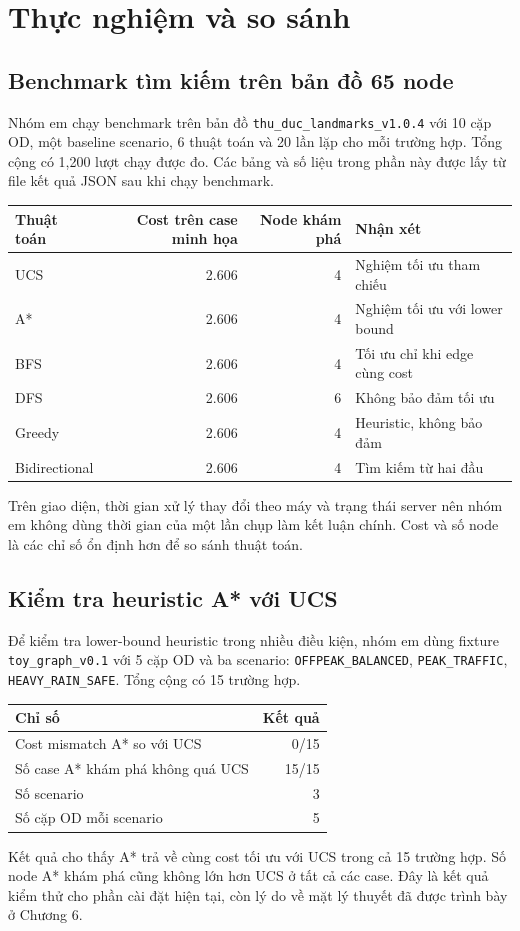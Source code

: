 \section{Thực nghiệm và so sánh}
\subsection{Benchmark tìm kiếm trên bản đồ 65 node}
Nhóm em chạy benchmark trên bản đồ \texttt{thu\_duc\_landmarks\_v1.0.4} với 10 cặp OD, một baseline scenario, 6 thuật toán và 20 lần lặp cho mỗi trường hợp. Tổng cộng có 1,200 lượt chạy được đo. Các bảng và số liệu trong phần này được lấy từ file kết quả JSON sau khi chạy benchmark.

\begin{center}
{\small
\begin{tabular}{l r r l}
\toprule
Thuật toán & Cost trên case minh họa & Node khám phá & Nhận xét\\
\midrule
UCS & 2.606 & 4 & Nghiệm tối ưu tham chiếu\\
A* & 2.606 & 4 & Nghiệm tối ưu với lower bound\\
BFS & 2.606 & 4 & Tối ưu chỉ khi edge cùng cost\\
DFS & 2.606 & 6 & Không bảo đảm tối ưu\\
Greedy & 2.606 & 4 & Heuristic, không bảo đảm\\
Bidirectional & 2.606 & 4 & Tìm kiếm từ hai đầu\\
\bottomrule
\end{tabular}
}
\end{center}
Trên giao diện, thời gian xử lý thay đổi theo máy và trạng thái server nên nhóm em không dùng thời gian của một lần chụp làm kết luận chính. Cost và số node là các chỉ số ổn định hơn để so sánh thuật toán.

\subsection{Kiểm tra heuristic A* với UCS}
Để kiểm tra lower-bound heuristic trong nhiều điều kiện, nhóm em dùng fixture \texttt{toy\_graph\_v0.1} với 5 cặp OD và ba scenario: \texttt{OFFPEAK\_BALANCED}, \texttt{PEAK\_TRAFFIC}, \texttt{HEAVY\_RAIN\_SAFE}. Tổng cộng có 15 trường hợp.
\begin{center}
\begin{tabular}{l r}
\toprule
Chỉ số & Kết quả\\
\midrule
Cost mismatch A* so với UCS & 0/15\\
Số case A* khám phá không quá UCS & 15/15\\
Số scenario & 3\\
Số cặp OD mỗi scenario & 5\\
\bottomrule
\end{tabular}
\end{center}
Kết quả cho thấy A* trả về cùng cost tối ưu với UCS trong cả 15 trường hợp. Số node A* khám phá cũng không lớn hơn UCS ở tất cả các case. Đây là kết quả kiểm thử cho phần cài đặt hiện tại, còn lý do về mặt lý thuyết đã được trình bày ở Chương 6.

